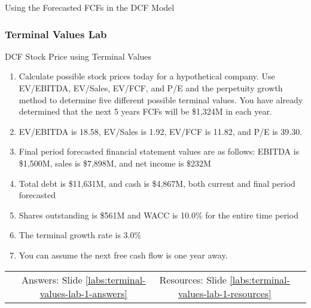 \documentclass[handout, 11pt]{beamer}
\begin{document}
\begin{section}[Valuation]{Using the Forecasted FCFs in the DCF Model}
\begin{frame}
\end{frame}
\footnotesize
\begin{frame}
\frametitle{Terminal Values Lab}
{
\begin{block}{DCF Stock Price using Terminal Values}
\begin{enumerate}
\item Calculate possible stock prices today for a hypothetical company. Use EV/EBITDA, EV/Sales, EV/FCF, and P/E and the perpetuity growth method to determine five different possible terminal values. You have already determined that the next 5 years FCFs will be \$1,324M in each year. 
\item EV/EBITDA is 18.58, EV/Sales is 1.92, EV/FCF is 11.82, and P/E is 39.30.
\item Final period forecasted financial statement values are as follows: EBITDA is \$1,500M, sales is \$7,898M, and net income is \$232M
\item Total debt is \$11,631M, and cash is \$4,867M, both current and final period forecasted
\item Shares outstanding is \$561M and WACC is 10.0\% for the entire time period
\item The terminal growth rate is 3.0\%
\item You can assume the next free cash flow is one year away.
\end{enumerate}
\vfill
\begin{tabular*}{\textwidth}{@{\extracolsep{\fill}}cccc}
\toprule
\hfill & Answers: Slide \textcolor{blue}{\underline{\ref{labs:terminal-values-lab-1-answers}}} & Resources: Slide \textcolor{blue}{\underline{\ref{labs:terminal-values-lab-1-resources}}} & \hfill\\

\end{tabular*}
\end{block}
}
\label{labs:terminal-values-lab-1}
\end{frame}
\normalsize
\end{section}
\appendix
{}
\setcounter{finalframe}{\value{framenumber}}
\end{document}
